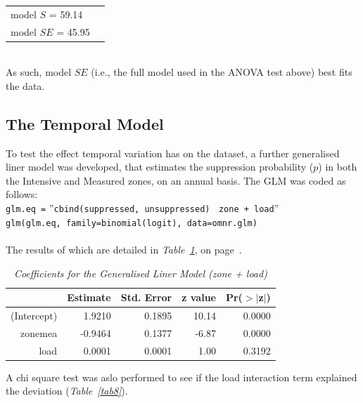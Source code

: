 \begin{spacing}{1.5}
\begin{tabular}{ll}
model $S$   = 59.14 \\
model $SE$ = 45.95 \\
\end{tabular}\\

\noindent As such, model $SE$ (i.e., the full model used in the ANOVA test above) best fits the data.

\subsection{The Temporal Model}
To test the effect temporal variation has on the dataset, a further generalised liner model was developed, that estimates the suppression probability ($p$) in both the Intensive and Measured zones, on an annual basis. The GLM was coded as follows: \\

\texttt{glm.eq =} ''\texttt{cbind(suppressed, unsuppressed)} $~$ \texttt{zone + load}'' \\

\texttt{glm(glm.eq, family=binomial(logit), data=omnr.glm) }\\ \\

\noindent The results of which are detailed in \emph{Table~\ref{tab7}}, on page~\pageref{tab7}. \\

\clearpage


\begin{table}[ht]
\begin{center}
\begin{tabular}{r|rrrr}
  \hline
 & Estimate & Std. Error & z value & Pr($>$$|$z$|$) \\ 
  \hline
(Intercept) & 1.9210 & 0.1895 & 10.14 & 0.0000 \\ 
  zonemea & -0.9464 & 0.1377 & -6.87 & 0.0000 \\ 
  load & 0.0001 & 0.0001 & 1.00 & 0.3192 \\ 
   \hline
\end{tabular}
\caption[Coefficients for the GLM (zone + load)]{\emph{Coefficients for the Generalised Liner Model (zone + load)}}
\label{tab7}
\end{center}
\end{table}
\noindent A chi square test was aslo performed to see if the load interaction term explained the deviation (\emph{Table~\ref{tab8}}). \\


\end{spacing}
